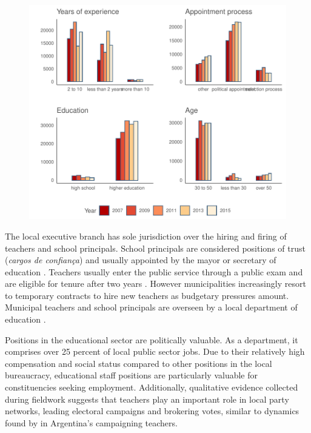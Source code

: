 \documentclass[12pt,a4paper]{article}
\begin{document}
\begin{figure}[h]
    \centering
    \includegraphics{plots/plot_principal_descriptive.pdf}
\end{figure}

The local executive branch has sole jurisdiction over the hiring and firing of teachers and school principals. School principals are considered positions of trust (\textit{cargos de confiança}) and usually appointed by the mayor or secretary of education \citet{brollo_victor_2017}. Teachers usually enter the public service through a public exam and are eligible for tenure after two years \citet{gatti_formacao_2010}. However municipalities increasingly resort to temporary contracts to hire new teachers as budgetary pressures amount. Municipal teachers and school principals are overseen by a local department of education \citep{militao_educacao_2014}.

Positions in the educational sector are politically valuable. As a department, it comprises over 25 percent of local public sector jobs. Due to their relatively high compensation and social status compared to other positions in the local bureaucracy, educational staff positions are particularly valuable for constituencies seeking employment. Additionally, qualitative evidence collected during fieldwork suggests that teachers play an important role in local party networks, leading electoral campaigns and brokering votes, similar to dynamics found by \citet{oliveros_making_2016} in Argentina's campaigning teachers.
\end{document}
